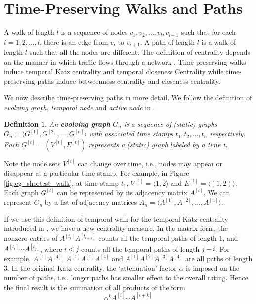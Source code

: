 \documentclass[12pt]{article}
\newtheorem{definition}{Definition}
\theoremstyle{definition}
\begin{document}
\section{Time-Preserving Walks and Paths}
\label{sec:time-pres-paths}

A walk of length $l$ is a sequence of nodes $v_1, v_2, \ldots, v_l, v_{l+1}$ such that for
each $i = 1, 2, \ldots, l$, there is an edge from $v_i$ to $v_{i+1}$. A path of length $l$ is a walk of length $l$
such that all the nodes are different.
The definition of centrality depends on the manner in which traffic flows through a network \cite{borgatti05}.
Time-preserving walks induce temporal Katz centrality and temporal closeness Centrality while time-preserving paths
induce betweenness centrality and closeness centrality.


We now describe time-preserving paths in more detail. We follow the definition of
\emph{evolving graph}, \emph{temporal node} and \emph{active node} in \cite{chen16}.

\begin{definition}
  An \textbf{evolving graph} $G_n$ is a sequence of (static) graphs
$G_n = \langle G^{[1]}, G^{[2]},  \ldots ,G^{[n]} \rangle$ with associated time stamps
$t_1, t_2, \ldots, t_n$ respectively. Each $G^{[t]} = (V^{[t]}, E^{[t]})$ represents a (static) graph labeled by a time t.
\end{definition}

Note the node sets $V^{[t]}$ can change over time, i.e., nodes may appear or disappear at a particular time stamp.
For example, in Figure \ref{fig:eg_shortest_walk}, at time stamp $t_1$, $V^{[1]} = \langle 1, 2 \rangle$ and $E^{[1]} = \langle (1,2) \rangle$. Each graph $G^{[t]}$ can be represented by its adjacency matrix $A^{[t]}$.
We can represent $G_n$ by a list of adjacency matrices $A_n = \langle A^{[1]}, A^{[2]}, \ldots, A^{[n]} \rangle$.

If we use this definition of temporal walk for the temporal Katz centrality introduced in
\cite{grindrod11}, we have a new centrality measure.
In the matrix form, the nonzero entries of $A^{[t_i]} A^{[t_{i+1}]}$ counts all the temporal paths of length $1$, and
$A^{[t_i]}\cdots A^{[t_j]}$, where $i < j$ counts all the temporal paths of length $j -i$.
For example, $A^{[1]}A^{[4]}$, $A^{[1]}A^{[1]}A^{[4]}$ and $A^{[1]}A^{[2]}A^{[3]}A^{[4]}$ are all paths of length 3.
In the original Katz centrality, the `attenuation' factor $\alpha$ is imposed on the
number of paths, i.e., longer paths has smaller effect to the overall rating.
Hence the final result is the summation of all products of the form
\[
\alpha^k A^{[i]} \cdots A^{[i+k]}
\]
\end{document}
